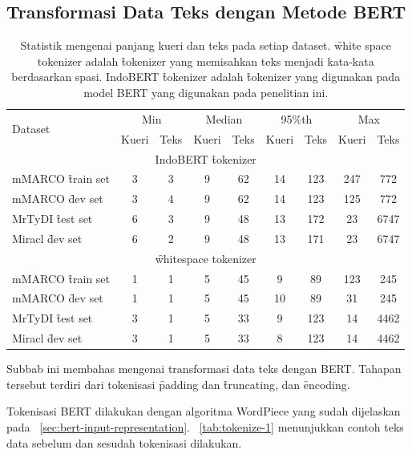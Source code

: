 \subsection{Transformasi Data Teks dengan Metode BERT}
\begin{table}[!ht]
    \centering
    \caption{Statistik mengenai panjang kueri dan teks pada setiap \f{dataset}. \f{white space tokenizer} adalah \f{tokenizer} yang memisahkan teks menjadi kata-kata berdasarkan spasi. IndoBERT \f{tokenizer} adalah \f{tokenizer} yang digunakan pada model BERT yang digunakan pada penelitian ini.}
    \label{tab:dataset-token-statistics}
    \begin{tabular}{lcccccccc}
        \multirow{2}{*}{Dataset} & \multicolumn{2}{c}{Min} & \multicolumn{2}{c}{Median} & \multicolumn{2}{c}{95\%th} & \multicolumn{2}{c}{Max} \\
        \cline{2-9}
        & Kueri & Teks & Kueri & Teks & Kueri & Teks & Kueri & Teks \\
        \multicolumn{9}{c}{IndoBERT \f{tokenizer}} \\
        \hline
        mMARCO \f{train set} & 3 & 3 & 9 & 62 & 14 & 123 & 247 & 772 \\
        mMARCO \f{dev set}   & 3 & 4 & 9 & 62 & 14 & 123 & 125 & 772 \\
        MrTyDI \f{test set}  & 6 & 3 & 9 & 48 & 13 & 172 & 23 & 6747 \\
        Miracl \f{dev set}   & 6 & 2 & 9 & 48 & 13 & 171 & 23 & 6747 \\
        \hline
        \multicolumn{9}{c}{\f{whitespace tokenizer}} \\
        mMARCO \f{train set} & 1 & 1 & 5 & 45 & 9 & 89 & 123 & 245 \\
        mMARCO \f{dev set}   & 1 & 1 & 5 & 45 & 10 & 89 & 31 & 245 \\
        MrTyDI \f{test set}  & 3 & 1 & 5 & 33 & 9 & 123 & 14 & 4462 \\
        Miracl \f{dev set}   & 3 & 1 & 5 & 33 & 8 & 123 & 14 & 4462 \\
        \hline
    \end{tabular}
\end{table}

Subbab ini membahas mengenai transformasi data teks dengan BERT. Tahapan tersebut terdiri dari tokenisasi \f{padding} dan \f{truncating}, dan \f{encoding}.

Tokenisasi BERT dilakukan dengan algoritma WordPiece yang sudah dijelaskan pada \sect~\ref{sec:bert-input-representation}. \tab~\ref{tab:tokenize-1} menunjukkan contoh teks data sebelum dan sesudah tokenisasi dilakukan.

